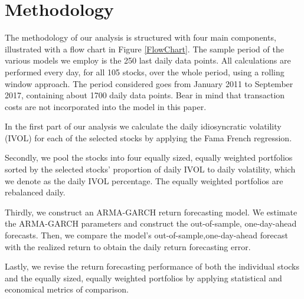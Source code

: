 \chapter{Methodology}
\label{Methodology}

The methodology of our analysis is structured with four main components, illustrated with a flow chart in Figure \ref{FlowChart}. The sample period of the various models we employ is the 250 last daily data points. All calculations are performed every day, for all 105 stocks, over the whole period, using a rolling window approach. The period considered goes from January 2011 to September 2017, containing about 1700 daily data points. Bear in mind that transaction costs are not incorporated into the model in this paper.

In the first part of our analysis we calculate the daily idiosyncratic volatility (IVOL) for each of the selected stocks by applying the Fama French regression.

Secondly, we pool the stocks into four equally sized, equally weighted portfolios sorted by the selected stocks' proportion of daily IVOL to daily volatility, which we denote as the daily IVOL percentage. The equally weighted portfolios are rebalanced daily.

Thirdly, we construct an ARMA-GARCH return forecasting model. We estimate the ARMA-GARCH parameters and construct the out-of-sample, one-day-ahead forecasts. Then, we compare the model’s out-of-sample,one-day-ahead forecast with the realized return to obtain the daily return forecasting error. 

Lastly, we revise the return forecasting performance of both the individual stocks and the equally sized, equally weighted portfolios by applying statistical and economical metrics of comparison.

